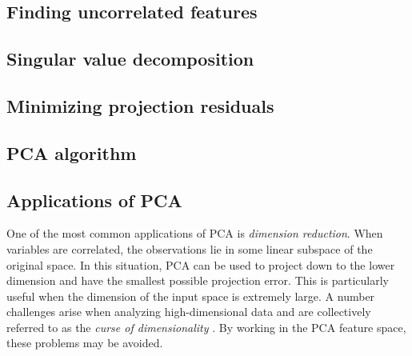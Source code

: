 


\subsection{Finding uncorrelated features}
\label{sub:finding-uncorrelated-features}


\subsection{Singular value decomposition}
\label{sub:singular-value-decomposition}


\subsection{Minimizing projection residuals}
\label{sub:minimizing-projection-residuals}


\subsection{PCA algorithm}


\begin{example}
    \label{eg:pca}
    
\end{example}

\subsection{Applications of PCA}

One of the most common applications of PCA is \textit{dimension reduction}.
When variables are correlated, the observations lie in some linear subspace of the original space.
In this situation, PCA can be used to project down to the lower dimension and have the smallest possible projection error.
This is particularly useful when the dimension of the input space is extremely large.
A number challenges arise when analyzing high-dimensional data and are collectively referred to as the \textit{curse of dimensionality} \cite{koutroumbas2008pattern}.
By working in the PCA feature space, these problems may be avoided.

\begin{example}
    \label{eg:pca-code}
    
\end{example}

% 

%     
